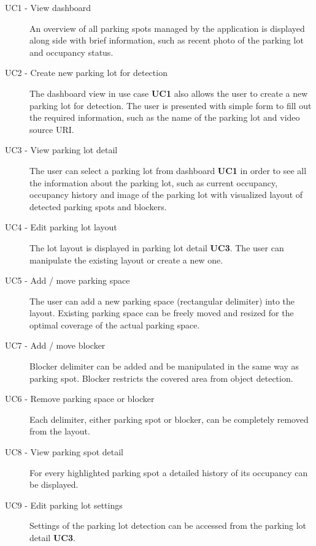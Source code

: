 \documentclass[thesis=M,english]{FITthesis}[2019/03/06]
\begin{document}
\begin{description}
    \item [UC1 - View dashboard] An overview of all parking spots managed by the application is displayed along side with brief information, such as recent photo of the parking lot and occupancy status.
    
    \item[UC2 - Create new parking lot for detection] 
    The dashboard view in use case \textbf{UC1} also allows the user to create a new parking lot for detection. The user is presented with simple form to fill out the required information, such as the name of the parking lot and video source URI.
    
    \item [UC3 - View parking lot detail]
    The user can select a parking lot from dashboard \textbf{UC1} in order to see all the information about the parking lot, such as current occupancy, occupancy history and image of the parking lot with visualized layout of detected parking spots and blockers.
    
    \item[UC4 - Edit parking lot layout]
    The lot layout is displayed in parking lot detail \textbf{UC3}. The user can manipulate the existing layout or create a new one.
    
    \item[UC5 - Add / move parking space]
    The user can add a new parking space (rectangular delimiter) into the layout. Existing parking space can be freely moved and resized for the optimal coverage of the actual parking space.
    
    \item[UC7 - Add / move blocker]
    Blocker delimiter can be added and be manipulated in the same way as parking spot. Blocker restricts the covered area from object detection.
    
    \item[UC6 - Remove parking space or blocker]
    Each delimiter, either parking spot or blocker, can be completely removed from the layout.
    
    \item[UC8 - View parking spot detail]
    For every highlighted parking spot a detailed history of its occupancy can be displayed.
    
    \item[UC9 - Edit parking lot settings]
    Settings of the parking lot detection can be accessed from the parking lot detail \textbf{UC3}.
    

\end{description}
\end{document}
